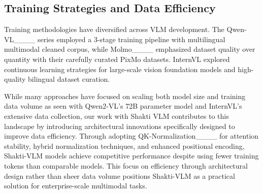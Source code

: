 \subsection{Training Strategies and Data Efficiency}
Training methodologies have diversified across VLM development. The Qwen-VL____ series employed a 3-stage training pipeline with multilingual multimodal cleaned corpus, while Molmo____ emphasized dataset quality over quantity with their carefully curated PixMo datasets. InternVL explored continuous learning strategies for large-scale vision foundation models and high-quality bilingual dataset curation. 

While many approaches have focused on scaling both model size and training data volume as seen with Qwen2-VL's 72B parameter model and InternVL's extensive data collection, our work with Shakti VLM contributes to this landscape by introducing architectural innovations specifically designed to improve data efficiency. Through adopting QK-Normalization____ for attention stability, hybrid normalization techniques, and enhanced positional encoding, Shakti-VLM models achieve competitive performance despite using fewer training tokens than comparable models. This focus on efficiency through architectural design rather than sheer data volume positions Shakti-VLM as a practical solution for enterprise-scale multimodal tasks.